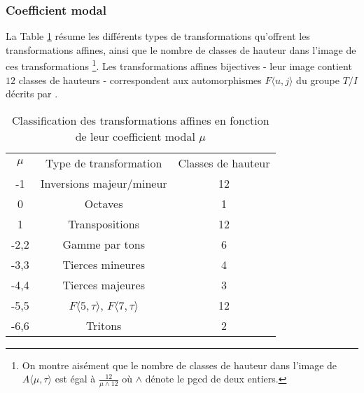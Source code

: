 \subsubsection{Coefficient modal}

La Table \ref{tab:classmu} résume les différents types de transformations qu'offrent les transformations affines, ainsi que le nombre de classes de hauteur dans l'image de ces transformations \footnote{On montre aisément que le nombre de classes de hauteur dans l'image de $A\langle \mu, \tau\rangle$ est égal à $\frac{12}{\mu\wedge 12}$ où $\wedge$ dénote le pgcd de deux entiers.}. Les transformations affines bijectives - leur image contient $12$ classes de hauteurs - correspondent  aux automorphismes $F\langle u,j \rangle$ du groupe $T/I$ décrits par \cite{lewin1990klumpenhouwer}.


\begin{table}[h]
  \centering
  \begin{tabular}{ccc}
    \rowcolor{gray!50}
    $\mu$ & Type de transformation & Classes de hauteur\\
    -1 & Inversions majeur/mineur & 12\\
    0 & Octaves & 1\\
    1 & Transpositions & 12 \\
    -2,2 & Gamme par tons & 6 \\
    -3,3 & Tierces mineures &4 \\
    -4,4 & Tierces majeures & 3\\
    -5,5 & $F\langle 5,\tau \rangle$, $F\langle 7,\tau \rangle$& 12 \\
    -6,6 & Tritons & 2\\
  \end{tabular}
  \caption{Classification des transformations affines en fonction de leur coefficient modal $\mu$\label{tab:classmu} } 
\end{table}